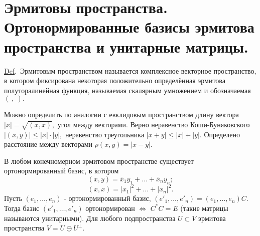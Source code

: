 \documentclass[a4paper]{article}%
\renewcommand{\de}{\par\noindent\underline{Def}.\ }%
\renewcommand{\ab}{\par\noindent}%
\newcommand{\baz}[1]{\left(#1_1,\dots,#1_n\right)}%
\newcommand{\lr}{\Leftrightarrow}%
\newcommand{\ps}{\oplus}
\renewcommand{\le}{\leqslant}
\begin{document}
\section{Эрмитовы пространства. Ортонормированные базисы эрмитова\\ пространства и унитарные матрицы.}
\label{q23} %
\de Эрмитовым пространством называется комплексное векторное пространство, в котором фиксирована некоторая
положительно определённая эрмитова полуторалинейная функция, называемая скалярным умножением и обозначаемая $(\
,\ ).$ %
\ab Можно определить по аналогии с евклидовым пространством длину вектора $|x|=\sqrt{(x,x)},$ угол между
векторами. Верно неравенство Коши-Буняковского $|(x,y)|\le |x|\cdot|y|,$ неравенство треугольника
$|x+y|\le|x|+|y|.$ Определено расстояние между векторами $\rho(x,y)=|x-y|.$ %
\ab В любом конечномерном эрмитовом пространстве существует ортонормированный базис, в котором
$$
(x,y)=\overline{x}_1y_1+\dots+\overline{x}_{n}y_{n};$$
$$
(x,x)=|x_1|^2+\dots+|x_{n}|^2.
$$
Пусть $\baz{e}$ - ортонормированный базис, $\baz{e'}=\baz{e}C.$\\ Тогда базис $\baz{e'}$ ортонормирован $\lr$ %
$C^*C=E$ (такие матрицы называются унитарными). %
Для любого подпространства $U\subset V$ эрмитова пространства $V=U\ps U^\bot.$

%
%
\end{document}
